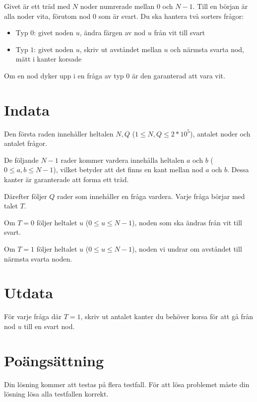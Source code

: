 Givet är ett träd med $N$ noder numrerade mellan $0$ och $N-1$. Till en början är alla noder vita,
förutom nod $0$ som är svart. Du ska hantera två sorters frågor:

\begin{itemize}
    \item Typ $0$: givet noden $u$, ändra färgen av nod $u$ från vit till svart
    \item Typ $1$: givet noden $u$, skriv ut avståndet mellan $u$ och närmsta svarta nod, mätt i kanter korsade
\end{itemize}

Om en nod dyker upp i en fråga av typ $0$ är den garanterad att vara vit.


\section*{Indata}
Den första raden innehåller heltalen $N, Q$ ($1 \leq N,Q \leq 2*10^5$), antalet noder och antalet frågor.

De följande $N-1$ rader kommer vardera innehålla heltalen $a$ och $b$ ($0 \leq a,b \leq N-1$), vilket
betyder att det finns en kant mellan nod $a$ och $b$. Dessa kanter är garanterade att forma ett träd.

Därefter följer $Q$ rader som innehåller en fråga vardera. Varje fråga börjar med talet $T$.

Om $T=0$ följer heltalet $u$ ($0 \leq u \leq N-1$), noden som ska ändras från vit till svart.

Om $T=1$ följer heltalet $u$ ($0 \leq u \leq N-1$), noden vi undrar om avståndet till närmsta svarta noden.

\section*{Utdata}
För varje fråga där $T=1$, skriv ut antalet kanter du behöver korsa för att gå från nod $u$ till en svart nod.

\section*{Poängsättning}
Din lösning kommer att testas på flera testfall.
\noindent
För att lösa problemet måste din lösning lösa alla testfallen korrekt.
